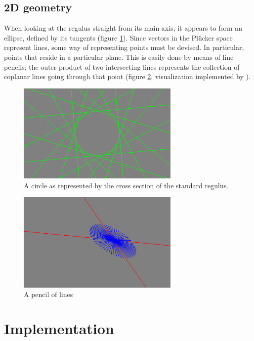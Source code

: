 \documentclass[a4paper, 10pt]{article}
\begin{document}
\subsection{2D geometry}
When looking at the regulus straight from its main axis, it appears to form an
ellipse, defined by its tangents (figure \ref{fig:circle}). Since vectors in the
Pl\"{u}cker space represent lines, some way of representing points must be
devised. In particular, points that reside in a particular plane. This is easily
done by means of line pencils; the outer product of two intersecting lines
represents the collection of coplanar lines going through that point (figure
\ref{fig:pencil}, visualization implemented by \cite{dekok2012}).

\begin{figure}[htbp]
  \centering
  \includegraphics[width=0.7\textwidth]{circle.png}
  \caption{A circle as represented by the cross section of the standard regulus.}
  \label{fig:circle}
\end{figure}

\begin{figure}[htbp]
  \centering
  \includegraphics[width=0.7\textwidth]{pencil.png}
  \caption{A pencil of lines}
  \label{fig:pencil}
\end{figure}

\section{Implementation}
\end{document}
